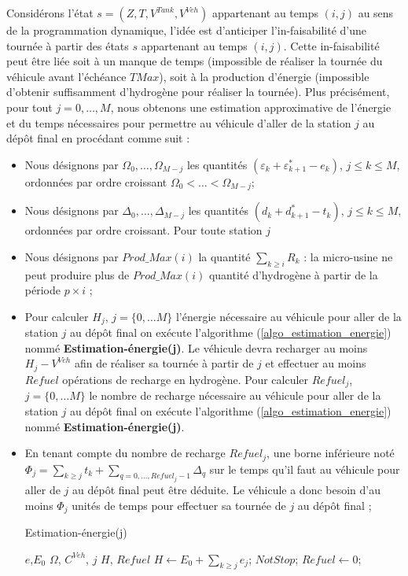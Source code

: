 Considérons l'état $s=(Z,T,V^{Tank}, V^{Veh})$ appartenant au temps $(i,j)$ au sens de la programmation dynamique, l'idée est d'anticiper l'in-faisabilité d'une tournée à partir des états $s$ appartenant au temps $(i, j)$. Cette in-faisabilité peut être liée soit à un manque de temps (impossible de réaliser la tournée du véhicule avant l'échéance $TMax$), soit à la production d'énergie (impossible d'obtenir suffisamment d'hydrogène pour réaliser la tournée). Plus précisément, pour tout $j = 0, \dots, M$, nous obtenons une estimation approximative de l'énergie et du temps nécessaires pour permettre au véhicule d'aller de la station $j$ au dépôt final en procédant comme suit : 

\begin{itemize}[label=$\square$]
	\item Nous désignons par $\Omega_0, \dots, \Omega_{M-j}$ les quantités $(\varepsilon_k + \varepsilon_{k+1}^* - e_k)$, $j \leq k \leq M$, ordonnées par ordre croissant  $\Omega_0 < \dots < \Omega_{M-j}$;
	\item Nous désignons par $\Delta_0, \dots, \Delta_{M-j}$ les quantités $(d_k + d_{k+1}^* - t_k)$, $j \leq k \leq M$, ordonnées par ordre croissant. Pour toute station $j$

	\item Nous désignons par $Prod\_Max(i)$ la quantité $\sum_{k\geq i}R_k$ : la micro-usine ne peut produire plus de $Prod\_Max(i)$ quantité d'hydrogène à partir de la période $p\times i$ ;
	\item Pour calculer $H_j$, $j=\{0, \dots M\}$ l'énergie nécessaire au véhicule pour aller de la station $j$ au dépôt final on exécute l'algorithme (\ref{algo_estimation_energie}) nommé \textbf{Estimation-énergie(j)}. Le véhicule devra recharger au moins $H_j - V^{Veh}$ afin de réaliser sa tournée à partir de $j$ et effectuer au moins $Refuel$ opérations de recharge en hydrogène. Pour calculer $Refuel_j$, $j=\{0, \dots M\}$ le nombre de recharge nécessaire au véhicule pour aller de la station $j$ au dépôt final on exécute l'algorithme (\ref{algo_estimation_energie}) nommé \textbf{Estimation-énergie(j)}.
	\item En tenant compte du nombre de recharge $Refuel_j$, une borne inférieure noté $\Phi_j =\sum_{k\geq j}t_k + \sum_{q=0, \dots, Refuel_j-1}\Delta_q$ sur le temps qu'il faut au véhicule pour aller de $j$ au dépôt final peut être déduite. Le véhicule a donc besoin d'au moins $\Phi_j$ unités de temps pour effectuer sa tournée de $j$ au dépôt final ;
	\begin{algorithm} 
		\caption{Estimation-énergie(j)}
		\label{algo_estimation_energie}
		\begin{algorithmic}[1]
			\REQUIRE $e$,$E_0$ $\Omega$, $C^{Veh}$, $j$
			\ENSURE $H$, $Refuel$
			\hline
			\vspace{0.5cm}
			\INITIALISATION
			\STATE $H \leftarrow E_0+\sum_{k\geq j} e_j  $; 
			\STATE $Not Stop$;
			\STATE $Refuel \leftarrow 0$;
			

\end{algorithmic}
\end{algorithm}
\end{itemize}
